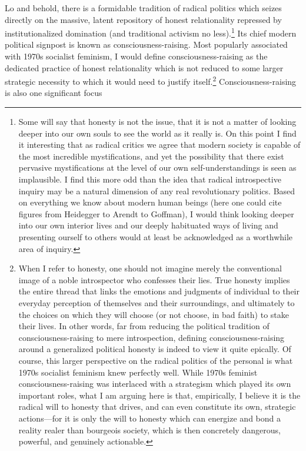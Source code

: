 \documentclass[a4paper,12pt,margin=.5in]{article}
\begin{document}
Lo and behold, there is a formidable tradition of radical politics which
seizes directly on the massive, latent repository of honest
relationality repressed by institutionalized domination (and traditional
activism no less).\footnote{Some will say that honesty is not the issue,
  that it is not a matter of looking deeper into our own souls to see
  the world as it really is. On this point I find it interesting that as
  radical critics we agree that modern society is capable of the most
  incredible mystifications, and yet the possibility that there exist
  pervasive mystifications at the level of our own self-understandings
  is seen as implausible. I find this more odd than the idea that
  radical introspective inquiry may be a natural dimension of any real
  revolutionary politics. Based on everything we know about modern human
  beings (here one could cite figures from Heidegger to Arendt to
  Goffman), I would think looking deeper into our own interior lives and
  our deeply habituated ways of living and presenting ourself to others
  would at least be acknowledged as a worthwhile area of inquiry.} Its
chief modern political signpost is known as consciousness-raising. Most
popularly associated with 1970s socialist feminism, I would define
consciousness-raising as the dedicated practice of honest relationality
which is not reduced to some larger strategic necessity to which it
would need to justify itself.\footnote{When I refer to honesty, one
  should not imagine merely the conventional image of a noble
  introspector who confesses their lies. True honesty implies the entire
  thread that links the emotions and judgments of individual to their
  everyday perception of themselves and their surroundings, and
  ultimately to the choices on which they will choose (or not choose, in
  bad faith) to stake their lives. In other words, far from reducing the
  political tradition of consciousness-raising to mere introspection,
  defining consciousness-raising around a generalized political honesty
  is indeed to view it quite epically. Of course, this larger
  perspective on the radical politics of the personal is what 1970s
  socialist feminism knew perfectly well. While 1970s feminist
  consciousness-raising was interlaced with a strategism which played
  its own important roles, what I am arguing here is that, empirically,
  I believe it is the radical will to honesty that drives, and can even
  constitute its own, strategic actions---for it is only the will to
  honesty which can energize and bond a reality realer than bourgeois
  society, which is then concretely dangerous, powerful, and genuinely
  actionable.} Consciousness-raising is also one significant focus
\end{document}
